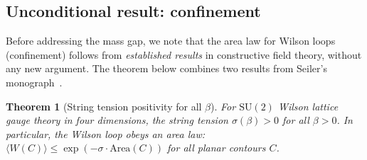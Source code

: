 \documentclass[11pt]{article}
\newtheorem{theorem}{Theorem}[section]
\theoremstyle{definition}
\newcommand{\SU}{\mathrm{SU}}
\begin{document}
\subsection{Unconditional result: confinement}

Before addressing the mass gap, we note that the area law for Wilson
loops (confinement) follows from \emph{established results} in
constructive field theory, without any new argument.  The theorem
below combines two results from Seiler's
monograph~\cite{Seiler82}.

\begin{theorem}[String tension positivity for all $\beta$]
\label{thm:string}
For $\SU(2)$ Wilson lattice gauge theory in four dimensions, the string
tension $\sigma(\beta)>0$ for all $\beta>0$.  In particular, the Wilson
loop obeys an area law: $\langle W(C)\rangle\le\exp(-\sigma\cdot
\mathrm{Area}(C))$ for all planar contours $C$.
\end{theorem}
\end{document}
